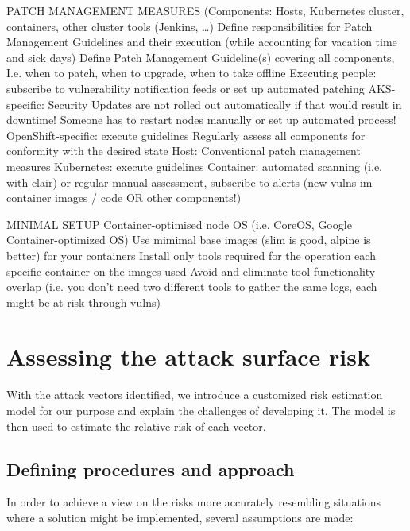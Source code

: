 PATCH MANAGEMENT MEASURES
(Components: Hosts, Kubernetes cluster, containers, other cluster tools (Jenkins, …)
	Define responsibilities for Patch Management Guidelines and their execution (while accounting for vacation time and sick days)
	Define Patch Management Guideline(s) covering all components, I.e. when to patch, when to upgrade, when to take offline
	Executing people: subscribe to vulnerability notification feeds or set up automated patching
	AKS-specific: Security Updates are not rolled out automatically if that would result in downtime! Someone has to restart nodes manually or set up automated process!
	OpenShift-specific: execute guidelines
	Regularly assess all components for conformity with the desired state
	Host: Conventional patch management measures
	Kubernetes: execute guidelines
	Container: automated scanning (i.e. with clair) or regular manual assessment, subscribe to alerts (new vulns im container images / code OR other components!)
	
MINIMAL SETUP	
	Container-optimised node OS (i.e. CoreOS, Google Container-optimized OS)
	Use mimimal base images (slim is good, alpine is better) for your containers
	Install only tools required for the operation each specific container on the images used
	Avoid and eliminate tool functionality overlap (i.e. you don’t need two different tools to gather the same logs, each might be at risk through vulns)


\chapter{Assessing the attack surface risk}

With the attack vectors identified, we introduce a customized risk estimation model for our purpose and explain the challenges of developing it. The model is then used to estimate the relative risk of each vector.

\section{Defining procedures and approach}
In order to achieve a view on the risks more accurately resembling situations where a solution might be implemented, several assumptions are made:

